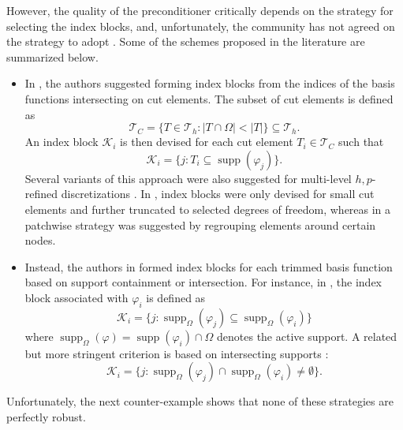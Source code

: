 \documentclass{article}
\numberwithin{equation}{section}
\DeclareMathOperator{\supp}{\operatorname{supp}}
\theoremstyle{definition}
\begin{document}
However, the quality of the preconditioner critically depends on the strategy for selecting the index blocks, and, unfortunately, the community has not agreed on the strategy to adopt \cite{de2023stability}. Some of the schemes proposed in the literature are summarized below. 
\begin{itemize}[noitemsep]
    \item In \cite{de2019preconditioning}, the authors suggested forming index blocks from the indices of the basis functions intersecting on cut elements. The subset of cut elements is defined as
    \begin{equation*}
        \mathcal{T}_C = \{T \in \mathcal{T}_h \colon |T \cap \Omega | < |T| \} \subseteq \mathcal{T}_h.
    \end{equation*}
    An index block $\mathcal{K}_i$ is then devised for each cut element $T_i \in \mathcal{T}_C$ such that
    \begin{equation}
    \label{eq: block_sel_cut_elem}
        \mathcal{K}_i = \{j \colon T_i \subseteq \supp(\varphi_j) \}.
    \end{equation}
    Several variants of this approach were also suggested for multi-level $h,p$-refined discretizations \cite{jomo2019robust,jomo2021hierarchical}. In \cite{jomo2019robust}, index blocks were only devised for small cut elements and further truncated to selected degrees of freedom, whereas in \cite{jomo2021hierarchical} a patchwise strategy was suggested by regrouping elements around certain nodes.
    \item Instead, the authors in \cite{de2020multigrid} formed index blocks for each trimmed basis function based on support containment or intersection. For instance, in \cite{de2020multigrid}, the index block associated with $\varphi_i$ is defined as
    \begin{equation}
    \label{eq: block_sel_supp_cont}
        \mathcal{K}_i = \{j \colon \supp_{\Omega}(\varphi_j) \subseteq \supp_{\Omega}(\varphi_i)\}
    \end{equation}
    where $\supp_{\Omega}(\varphi)=\supp(\varphi_i) \cap \Omega$ denotes the active support. A related but more stringent criterion is based on intersecting supports \cite{de2023stability}:
    \begin{equation}
    \label{eq: block_sel_supp_int}
        \mathcal{K}_i = \{j \colon \supp_{\Omega}(\varphi_j) \cap \supp_{\Omega}(\varphi_i) \neq \emptyset\}.
    \end{equation}
\end{itemize}
Unfortunately, the next counter-example shows that none of these strategies are perfectly robust.
\end{document}
